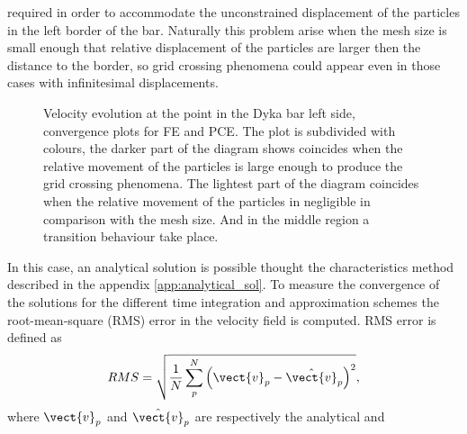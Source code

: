 required in order to accommodate the unconstrained displacement of the
particles in the left border of the bar. Naturally this problem arise
when the mesh size is small enough that relative displacement of the
particles are larger then the distance to the border, so grid crossing
phenomena could appear even in those cases with infinitesimal
displacements.
\begin{figure}\sidecaption
  \centering
  \caption{Velocity evolution at the point in the Dyka bar left side,
    convergence plots for FE and PCE. The plot is subdivided with
    colours, the darker part of the diagram shows coincides when the
    relative movement of the particles is large enough to produce the
    grid crossing phenomena. The lightest part of the diagram
    coincides when the relative movement of the particles in
    negligible in comparison with the mesh size. And in the middle
    region a transition behaviour take place.}
  \label{fig:Dyka-error-evol}
\end{figure}
In this case, an analytical solution is possible
thought the characteristics method described in the appendix
\ref{app:analytical_sol}. To measure the convergence of the solutions
for the different time integration and approximation schemes the
root-mean-square (RMS) error in the velocity field is computed. RMS
error is defined as
\begin{equation}
  \label{eq:RMS}
  RMS = \sqrt{\frac{1}{N} \sum^{N}_p \left( \vect{v}_p - \hat{\vect{v}}_p \right)^2},
\end{equation}
where $\vect{v}_p$ and $\hat{\vect{v}}_p$ are respectively the analytical and
